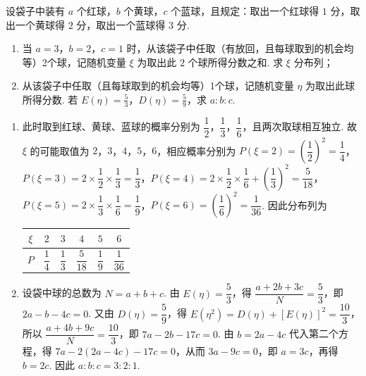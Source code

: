 \begin{problem}
设袋子中装有 \(a\) 个红球，\(b\) 个黄球，\(c\) 个蓝球，且规定：取出一个红球得 \(1\) 分，取出一个黄球得 \(2\) 分，取出一个蓝球得 \(3\) 分.

\begin{enumerate}
\item 当 \(a = 3\)，\(b = 2\)，\(c = 1\) 时，从该袋子中任取（有放回，且每球取到的机会均等）2个球，记随机变量 \(\xi\) 为取出此 \(2\) 个球所得分数之和. 求 \(\xi\) 分布列；
\item 从该袋子中任取（且每球取到的机会均等）1个球，记随机变量 \(\eta\) 为取出此球所得分数. 若 \(E(\eta) = \frac{5}{3}\)，\(D(\eta) = \frac{5}{9}\)，求 \(a:b:c\).
\end{enumerate}
\end{problem}

\begin{solution}
\begin{enumerate}
\item 此时取到红球、黄球、蓝球的概率分别为 \(\dfrac12\)，\(\dfrac13\)，\(\dfrac16\)，且两次取球相互独立. 故 \(\xi\) 的可能取值为 \(2\)，\(3\)，\(4\)，\(5\)，\(6\)，相应概率分别为
\(P(\xi=2)=\left(\dfrac12\right)^{2}=\dfrac14\)，\(P(\xi=3)=2\times\dfrac12\times\dfrac13=\dfrac13\)，\(P(\xi=4)=2\times\dfrac12\times\dfrac16+\left(\dfrac13\right)^{2}=\dfrac{5}{18}\)，\(P(\xi=5)=2\times\dfrac13\times\dfrac16=\dfrac19\)，\(P(\xi=6)=\left(\dfrac16\right)^{2}=\dfrac1{36}\). 因此分布列为
\begin{center}
\begin{tabular}{c|ccccc}
\(\xi\) & \(2\) & \(3\) & \(4\) & \(5\) & \(6\) \\
\hline
\(P\) & \(\dfrac14\) & \(\dfrac13\) & \(\dfrac{5}{18}\) & \(\dfrac19\) & \(\dfrac1{36}\) \\
\end{tabular}
\end{center}

\item 设袋中球的总数为 \(N=a+b+c\). 由 \(E(\eta)=\dfrac53\)，得
\(\dfrac{a+2b+3c}{N}=\dfrac53\)，即 \(2a-b-4c=0\). 又由 \(D(\eta)=\dfrac59\)，得 \(E(\eta^{2})=D(\eta)+[E(\eta)]^{2}=\dfrac{10}{3}\)，所以 \(\dfrac{a+4b+9c}{N}=\dfrac{10}{3}\)，即 \(7a-2b-17c=0\). 由 \(b=2a-4c\) 代入第二个方程，得 \(7a-2(2a-4c)-17c=0\)，从而 \(3a-9c=0\)，即 \(a=3c\)，再得 \(b=2c\). 因此 \(a:b:c=3:2:1\).
\end{enumerate}
\end{solution}

